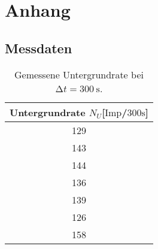 \section{Anhang}


\subsection{Messdaten}

\begin{table}
\centering
\caption{Gemessene Untergrundrate bei $\increment t = \SI{300}{\second}$\cite{hinweis}.}
\label{tab:ogemessdaten4}
\begin{tabular}{c }
    \toprule
    Untergrundrate $N_{U}$[$\text{Imp}$/$300\si{\second}$] \\
    \midrule
    129 \\
    143 \\
    144 \\
    136 \\
    139 \\
    126 \\ 
    158 \\
    \bottomrule
\end{tabular}
\end{table}

